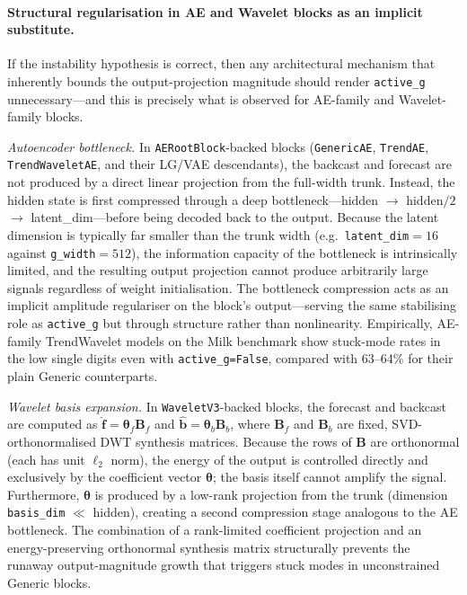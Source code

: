 \documentclass{article}
\begin{document}
\paragraph{Structural regularisation in AE and Wavelet blocks as an implicit substitute.}
If the instability hypothesis is correct, then any architectural mechanism that inherently bounds the output-projection magnitude should render \texttt{active\_g} unnecessary---and this is precisely what is observed for AE-family and Wavelet-family blocks.

\emph{Autoencoder bottleneck.} In \texttt{AERootBlock}-backed blocks (\texttt{GenericAE}, \texttt{TrendAE}, \texttt{TrendWaveletAE}, and their LG/VAE descendants), the backcast and forecast are not produced by a direct linear projection from the full-width trunk. Instead, the hidden state is first compressed through a deep bottleneck---hidden $\to$ hidden$/2$ $\to$ latent\_dim---before being decoded back to the output. Because the latent dimension is typically far smaller than the trunk width (e.g.\ \texttt{latent\_dim}$=16$ against \texttt{g\_width}$=512$), the information capacity of the bottleneck is intrinsically limited, and the resulting output projection cannot produce arbitrarily large signals regardless of weight initialisation. The bottleneck compression acts as an implicit amplitude regulariser on the block's output---serving the same stabilising role as \texttt{active\_g} but through structure rather than nonlinearity. Empirically, AE-family TrendWavelet models on the Milk benchmark show stuck-mode rates in the low single digits even with \texttt{active\_g=False}, compared with 63--64\% for their plain Generic counterparts.

\emph{Wavelet basis expansion.} In \texttt{WaveletV3}-backed blocks, the forecast and backcast are computed as $\hat{\mathbf{f}} = \boldsymbol{\theta}_f \mathbf{B}_f$ and $\hat{\mathbf{b}} = \boldsymbol{\theta}_b \mathbf{B}_b$, where $\mathbf{B}_f$ and $\mathbf{B}_b$ are fixed, SVD-orthonormalised DWT synthesis matrices. Because the rows of $\mathbf{B}$ are orthonormal (each has unit $\ell_2$ norm), the energy of the output is controlled directly and exclusively by the coefficient vector $\boldsymbol{\theta}$; the basis itself cannot amplify the signal. Furthermore, $\boldsymbol{\theta}$ is produced by a low-rank projection from the trunk (dimension \texttt{basis\_dim} $\ll$ hidden), creating a second compression stage analogous to the AE bottleneck. The combination of a rank-limited coefficient projection and an energy-preserving orthonormal synthesis matrix structurally prevents the runaway output-magnitude growth that triggers stuck modes in unconstrained Generic blocks.
\end{document}

